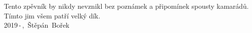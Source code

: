 ﻿\begin{center}
Tento zpěvník by nikdy nevznikl bez poznámek a připomínek spousty kamarádů. \\
Tímto jim všem patří velký dík. \\ \vspace{\baselineskip}
2019\,-\,{\the\year},~Štěpán~Bořek
\end{center}